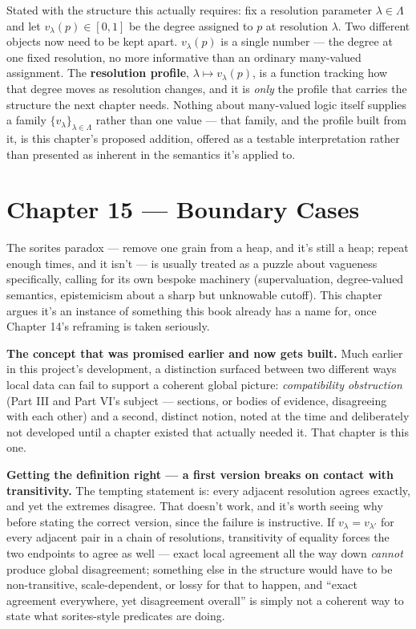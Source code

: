 Stated with the structure this actually requires: fix a resolution
parameter \(\lambda \in \Lambda\) and let \(v_\lambda(p) \in [0,1]\) be the
degree assigned to \(p\) at resolution \(\lambda\). Two different objects
now need to be kept apart. \(v_\lambda(p)\) is a single number --- the degree
at one fixed resolution, no more informative than an ordinary many-valued
assignment. The \textbf{resolution profile}, \(\lambda \mapsto v_\lambda(p)\),
is a function tracking how that degree moves as resolution changes, and
it is \emph{only} the profile that carries the structure the next chapter
needs. Nothing about many-valued logic itself supplies a family
\(\{v_\lambda\}_{\lambda \in \Lambda}\) rather than one value --- that
family, and the profile built from it, is this chapter's proposed
addition, offered as a testable interpretation rather than presented as
inherent in the semantics it's applied to.

\hypertarget{chapter-15-boundary-cases}{%
\chapter*{Chapter 15 --- Boundary Cases}
\label{chapter-15-boundary-cases}}

The sorites paradox --- remove one grain from a heap, and it's still a
heap; repeat enough times, and it isn't --- is usually treated as a puzzle
about vagueness specifically, calling for its own bespoke machinery
(supervaluation, degree-valued semantics, epistemicism about a sharp but
unknowable cutoff). This chapter argues it's an instance of something
this book already has a name for, once Chapter 14's reframing is taken
seriously.

\textbf{The concept that was promised earlier and now gets built.} Much
earlier in this project's development, a distinction surfaced between two
different ways local data can fail to support a coherent global picture:
\emph{compatibility obstruction} (Part III and Part VI's subject --- sections,
or bodies of evidence, disagreeing with each other) and a second,
distinct notion, noted at the time and deliberately not developed until
a chapter existed that actually needed it. That chapter is this one.

\textbf{Getting the definition right --- a first version breaks on contact with
transitivity.} The tempting statement is: every adjacent resolution
agrees exactly, and yet the extremes disagree. That doesn't work, and
it's worth seeing why before stating the correct version, since the
failure is instructive. If \(v_\lambda = v_{\lambda'}\) for every adjacent
pair in a chain of resolutions, transitivity of equality forces the two
endpoints to agree as well --- exact local agreement all the way down
\emph{cannot} produce global disagreement; something else in the structure
would have to be non-transitive, scale-dependent, or lossy for that to
happen, and ``exact agreement everywhere, yet disagreement overall'' is
simply not a coherent way to state what sorites-style predicates are
doing.

